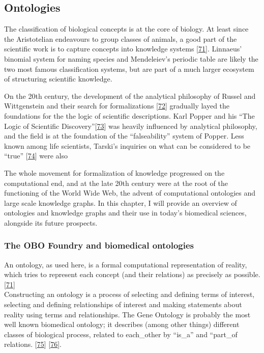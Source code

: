 \hypertarget{ontologies}{%
\subsection{Ontologies}\label{ontologies}}

The classification of biological concepts is at the core of biology. At least since the Aristotelian endeavours to group classes of animals, a good part of the scientific work is to capture concepts into knowledge systems {[}\protect\hyperlink{ref-DLTMbf54}{71}{]}.
Linnaeus' binomial system for naming species and Mendeleiev's periodic table are likely the two most famous classification systems, but are part of a much larger ecosystem of structuring scientific knowledge.

On the 20th century, the development of the analytical philosophy of Russel and Wittgenstein and their search for formalizations {[}\protect\hyperlink{ref-cZEmYsqx}{72}{]} gradually layed the foundations for the the logic of scientific descriptions. Karl Popper and his ``The Logic of Scientific Discovery''{[}\protect\hyperlink{ref-to2onCDy}{73}{]} was heavily influenced by analytical philosophy, and the field is at the foundation of the ``falseability'' system of Popper. Less known among life scientists, Tarski's inquiries on what can be considered to be ``true'' {[}\protect\hyperlink{ref-RghcuiSS}{74}{]} were also

The whole movement for formalization of knowledge progressed on the computational end, and at the late 20th century were at the root of the functioning of the World Wide Web, the advent of computational ontologies and large scale knowledge graphs.
In this chapter, I will provide an overview of ontologies and knowledge graphs and their use in today's biomedical sciences, alongside its future prospects.

\hypertarget{the-obo-foundry-and-biomedical-ontologies}{%
\subsubsection{The OBO Foundry and biomedical ontologies}\label{the-obo-foundry-and-biomedical-ontologies}}

An ontology, as used here, is a formal computational representation of reality, which tries to represent each concept (and their relations) as precisely as possible. {[}\protect\hyperlink{ref-DLTMbf54}{71}{]}\\
Constructing an ontology is a process of selecting and defining terms of interest, selecting and defining relationships of interest and making statements about reality using terms and relationships.
The Gene Ontology is probably the most well known biomedical ontology; it describes (among other things) different classes of biological process, related to each\_other by ``is\_a'' and ``part\_of relations. {[}\protect\hyperlink{ref-18wkLcGxT}{75}{]} {[}\protect\hyperlink{ref-2KmDs8gy}{76}{]}.

